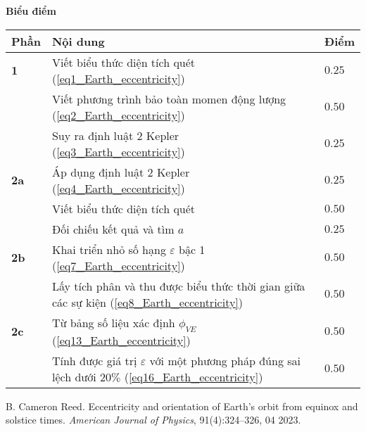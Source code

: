 \textbf{Biểu điểm}
\begin{center}
\begin{tabular}{|>{\centering\arraybackslash}m{1cm}|>{\raggedright\arraybackslash}m{14cm}| >{\centering\arraybackslash}m{1cm}|}
    \hline
    \textbf{Phần} & \textbf{Nội dung} & \textbf{Điểm} \\
    \hline
    \textbf{1} & Viết biểu thức diện tích quét (\ref{eq1_Earth_eccentricity}) & $0.25$ \\
    \cline{2-3}
    & Viết phương trình bảo toàn momen động lượng (\ref{eq2_Earth_eccentricity}) & $0.50$ \\
    \cline{2-3}
    & Suy ra định luật 2 Kepler (\ref{eq3_Earth_eccentricity}) & $0.25$ \\
    \hline
    \textbf{2a} & Áp dụng định luật 2 Kepler (\ref{eq4_Earth_eccentricity}) & $0.25$ \\
    \cline{2-3}
    & Viết biểu thức diện tích quét & $0.50$ \\
    \cline{2-3}
    & Đối chiếu kết quả và tìm $a$ & $0.25$ \\
    \hline
    \textbf{2b} & Khai triển nhỏ số hạng $\varepsilon$ bậc 1 (\ref{eq7_Earth_eccentricity}) & $0.50$ \\
    \cline{2-3}
    & Lấy tích phân và thu được biểu thức thời gian giữa các sự kiện (\ref{eq8_Earth_eccentricity}) & $0.50$ \\
    \hline
    \textbf{2c} & Từ bảng số liệu xác định $\phi_{VE}$ (\ref{eq13_Earth_eccentricity}) & $0.50$ \\
    \cline{2-3}
    & Tính được giá trị $\varepsilon$ với một phương pháp đúng sai lệch dưới $20\%$ (\ref{eq16_Earth_eccentricity}) & $0.50$ \\
    \hline
\end{tabular}
\end{center}


\begin{thebibliography}{}
 B. Cameron Reed. Eccentricity and orientation of Earth’s orbit from equinox and solstice times. \textit{American Journal of Physics}, 91(4):324–326, 04 2023.
\end{thebibliography}